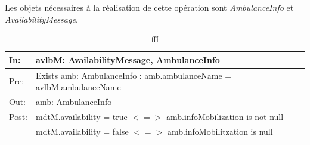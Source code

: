 Les objets nécessaires à la réalisation de cette opération sont \textit{AmbulanceInfo}
et \textit{AvailabilityMessage}.

\begin{table}
	\begin{tabular}{|l|l|}\hline
In:  	&avlbM: AvailabilityMessage, AmbulanceInfo\\ \hline
Pre: 	&Exists amb: AmbulanceInfo : amb.ambulanceName = avlbM.ambulanceName\\ \hline

Out:  	&amb: AmbulanceInfo\\ \hline
Post:	&mdtM.availability = true $<=>$ amb.infoMobilization is not null \\ \hline
	&mdtM.availability = false $<=>$ amb.infoMobilitzation is null\\ \hline
	\end{tabular}
	\caption{fff}
\end{table}
